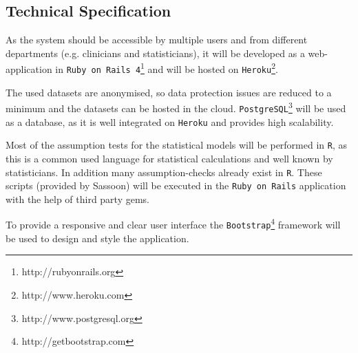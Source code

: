 \subsection{Technical Specification}
\label{sub:technical}

As the system should be accessible by multiple users and from different departments (e.g. clinicians and statisticians), it will be developed as a web-application in \texttt{Ruby on Rails 4}\footnote{http://rubyonrails.org} and will be hosted on \texttt{Heroku}\footnote{http://www.heroku.com}. 

The used datasets are anonymised, so data protection issues are reduced to a minimum and the datasets can be hosted in the cloud. \texttt{PostgreSQL}\footnote{http://www.postgresql.org} will be used as a database, as it is well integrated on \texttt{Heroku} and provides high scalability.

Most of the assumption tests for the statistical models will be performed in \texttt{R}, as this is a common used language for statistical calculations and well known by statisticians. In addition many assumption-checks already exist in \texttt{R}. These scripts (provided by Sassoon) will be executed in the \texttt{Ruby on Rails} application with the help of third party gems.

To provide a responsive and clear user interface the \texttt{Bootstrap}\footnote{http://getbootstrap.com} framework will be used to design and style the application. 




